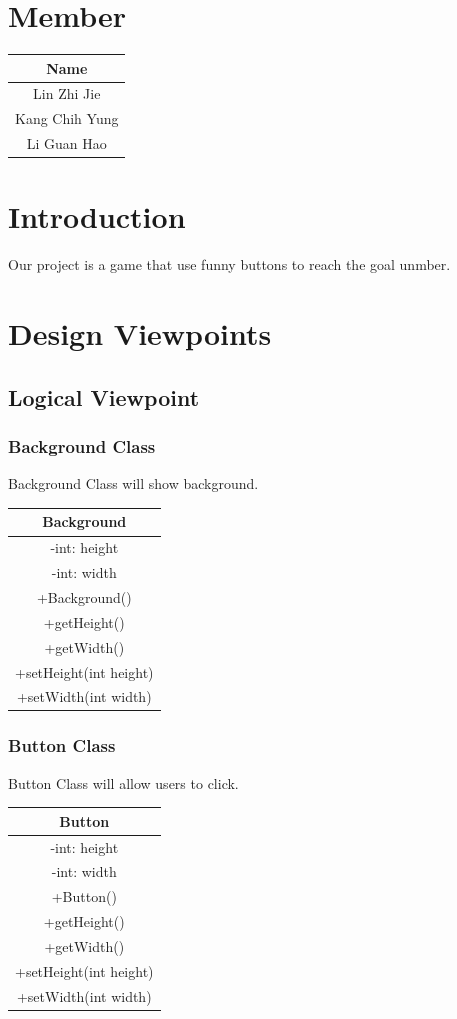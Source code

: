 \section{Member}
\begin{center}\begin{tabular}{ |c| } \hline Name \\ \hline Lin Zhi Jie \\ \hline Kang Chih Yung \\ \hline Li Guan Hao \\ \hline \end{tabular}\end{center}

\section{Introduction}
Our project is a game that use funny buttons to reach the goal unmber.
\section{Design Viewpoints}

\subsection{Logical Viewpoint}

\subsubsection{Background Class}
Background Class will show background.
\begin{center}\begin{tabular}{ |c| } \hline Background \\ \hline -int: height \\ -int: width \\ \hline +Background() \\ +getHeight() \\ +getWidth() \\ +setHeight(int height) \\ +setWidth(int width) \\ \hline \end{tabular}\end{center}

\subsubsection{Button Class}
Button Class will allow users to click.
\begin{center}\begin{tabular}{ |c| } \hline Button \\ \hline -int: height \\ -int: width \\ \hline +Button() \\ +getHeight() \\ +getWidth() \\ +setHeight(int height) \\ +setWidth(int width) \\ \hline \end{tabular}\end{center}

